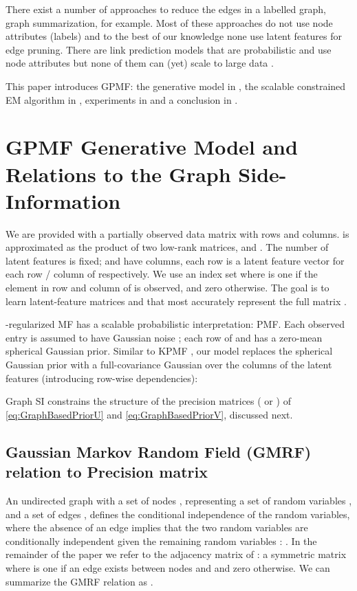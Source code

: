 \documentclass{article}
\theoremstyle{plain}
\theoremstyle{definition}
\theoremstyle{remark}
\begin{document}
There exist a number of approaches to reduce the edges in a labelled graph, graph summarization, \citet{liu2018graph} for example. Most of these approaches do not use node attributes (labels) and to the best of our knowledge none use latent features for edge pruning. There are link prediction models that are probabilistic and use node attributes \cite{haghani2017systemic} but none of them can (yet) scale to large data \cite{li2014lrbm,nguyen2012latent,zhao2017leveraging}.

This paper introduces GPMF: the generative model in , the scalable constrained EM algorithm in , experiments in  and a conclusion in .

\section{GPMF Generative Model and Relations to the Graph Side-Information} \label{sec:GenarativeModel}

We are provided with a partially observed data matrix  with  rows and  columns.  is approximated as the product of two low-rank matrices,  and . The number of latent features  is fixed;  and  have  columns, each row is a latent feature vector for each row / column of  respectively. We use an index set  where  is one if the element in row  and column  of  is observed, and zero otherwise. The goal is to learn latent-feature matrices  and  that most accurately represent the full matrix .

-regularized MF has a scalable probabilistic interpretation: PMF. Each observed entry  is assumed to have Gaussian noise ; each row of  and  has a zero-mean spherical Gaussian prior.  Similar to KPMF \cite{zhou2012kernelized}, our model replaces the spherical Gaussian prior with a full-covariance Gaussian over the columns of the latent features (introducing row-wise dependencies):

Graph SI constrains the structure of the precision matrices ( or ) of \eqref{eq:GraphBasedPriorU} and \eqref{eq:GraphBasedPriorV},  discussed next. 
\subsection{Gaussian Markov Random Field (GMRF) relation to Precision matrix} An undirected graph  with a set of nodes , representing a set of random variables , and a set of edges , defines the conditional independence of the random variables, where the absence of an edge  implies that the two random variables are conditionally independent  given the remaining random variables \cite{bishop2006PRML,hastie2009elements,lauritzen1996graphical,rue2005gaussian}: . In the remainder of the paper we refer to the adjacency matrix of  : a symmetric matrix where  is one if an edge exists between nodes  and  and zero otherwise. We can summarize the GMRF relation as .
\end{document}
